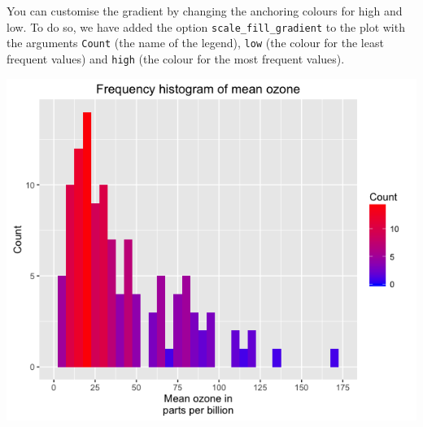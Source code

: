 You can customise the gradient by changing the anchoring colours for
high and low. To do so, we have added the option
\texttt{scale\_fill\_gradient} to the plot with the arguments
\texttt{Count} (the name of the legend), \texttt{low} (the colour for
the least frequent values) and \texttt{high} (the colour for the most
frequent values).

\begin{Shaded}
\begin{Highlighting}[]
\StringTok{ }\NormalTok{(} \StringTok{ }
\StringTok{      }\NormalTok{(}\NormalTok{(}  \NormalTok{) +}
\StringTok{      }\NormalTok{(} \NormalTok{,}
\StringTok{        } \NormalTok{(}\NormalTok{, }\NormalTok{, }\NormalTok{),}
\StringTok{        }\NormalTok{(}\NormalTok{, }\NormalTok{)) +}
\StringTok{      }\NormalTok{(} \NormalTok{) +}
\StringTok{      }\NormalTok{(}\NormalTok{) +}
\StringTok{      }\NormalTok{(}\NormalTok{, } \NormalTok{, } \NormalTok{)}
\end{Highlighting}
\end{Shaded}

\begin{center}\includegraphics[width=0.55\linewidth]{0_all_posts_pdf/histogram_12-1} \end{center}

